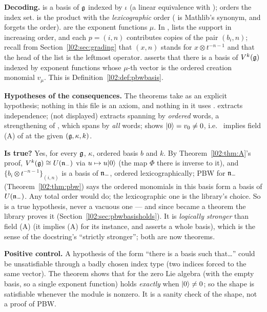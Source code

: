 \begin{dictionary}
\textbf{Decoding.}  is a basis of $\mathfrak{g}$ indexed by $\iota$ (a linear
equivalence with ); \lean{[LinearOrder ι]} orders the index set.  is the
product with the \emph{lexicographic} order ( is Mathlib's  synonym, and 
forgets the order).  are the exponent functions $\mu$. In ,
 lists the support in increasing order, and each $p = (i,n)$ contributes
 copies of the pair $(b_i,n)$; recall from Section~\ref{l02:sec:grading} that $(x,n)$ stands for
$x\otimes t^{-n-1}$ and that the head of the list is the leftmost operator. 
asserts that there is a basis  of $V^k(\mathfrak{g})$ indexed by exponent functions whose $\mu$-th
vector is the ordered creation monomial $v_\mu$. This is Definition~\ref{l02:def:pbwbasis}.

\textbf{Hypotheses of the consequences.} The theorems take  as an explicit
hypothesis; nothing in this file is an axiom, and nothing in it uses .  extracts independence;
 (not displayed) extracts spanning by \emph{ordered} words, a strengthening of
, which spans by \emph{all} words; \allowbreak{} shows
$|0\rangle = v_0\ne0$, i.e.\  implies field (A) of  at the given
$(\mathfrak{g},\kappa,k)$.

\textbf{Is  true?} Yes, for every $\mathfrak{g}$, $\kappa$, ordered basis $b$ and $k$. By
Theorem~\ref{l02:thm:A}'s proof, $V^k(\mathfrak{g})\cong U(\mathfrak{n}_-)$ via $u\mapsto u|0\rangle$ (the map
$\Phi$ there is inverse to it), and $\{b_i\otimes t^{-n-1}\}_{(i,n)}$ is a basis of $\mathfrak{n}_-$, ordered
lexicographically; PBW for $\mathfrak{n}_-$ (Theorem~\ref{l02:thm:pbw}) says the ordered monomials in this
basis form a basis of $U(\mathfrak{n}_-)$. Any total order would do; the lexicographic one is the library's
choice. So  is a true hypothesis, never a vacuous one --- and since  became a theorem the
library proves it (Section~\ref{l02:sec:pbwbasisholds}). It is \emph{logically stronger} than field (A)
(it implies (A) for its instance, and asserts a whole basis), which is the sense of the docstring's
``strictly stronger''; both are now theorems.

\textbf{Positive control.} A hypothesis of the form ``there is a basis such that\ldots'' could be
unsatisfiable through a badly chosen index type (two indices forced to the same vector). The theorem
\allowbreak{}\allowbreak{}\allowbreak{} shows that for the zero Lie algebra (with the empty basis, so a
single exponent function)  holds \emph{exactly} when $|0\rangle\ne0$; so the shape is
satisfiable whenever the module is nonzero. It is a sanity check of the shape, not a proof of PBW.
\end{dictionary}

